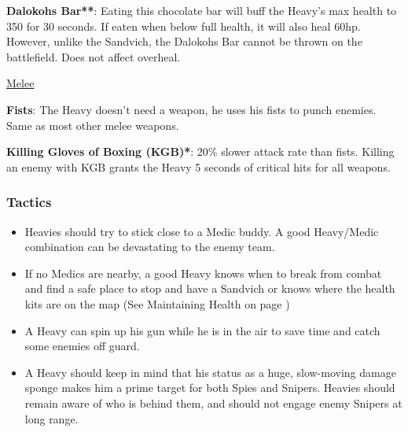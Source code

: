 {\bf Dalokohs Bar**}: Eating this chocolate bar will buff the Heavy's max health to 350 for 30 seconds. If eaten when below full health, it will also heal 60hp. However, unlike the Sandvich, the Dalokohs Bar cannot be thrown on the battlefield. Does not affect overheal.

\newpage

\begin {center}
\underline {Melee}
\end {center}

{\bf Fists}: The Heavy doesn't need a weapon, he uses his fists to punch enemies. Same as most other melee weapons.

{\bf Killing Gloves of Boxing (KGB)*}: 20\% slower attack rate than fists.  Killing an enemy with KGB grants the Heavy 5 seconds of critical hits for all weapons.


\subsubsection {Tactics}
\begin {itemize}

\item Heavies should try to stick close to a Medic buddy. A good Heavy/Medic combination can be devastating to the enemy team. 

\item If no Medics are nearby, a good Heavy knows when to break from combat and find a safe place to stop and have a Sandvich or knows where the health kits are on the map (See Maintaining Health on page \pageref{Maintaining_Health})

\item A Heavy can spin up his gun while he is in the air to save time and catch some enemies off guard.

\item A Heavy should keep in mind that his status as a huge, slow-moving damage sponge makes him a prime target for both Spies and Snipers. Heavies should remain aware of who is behind them, and should not engage enemy Snipers at long range.

\end {itemize}